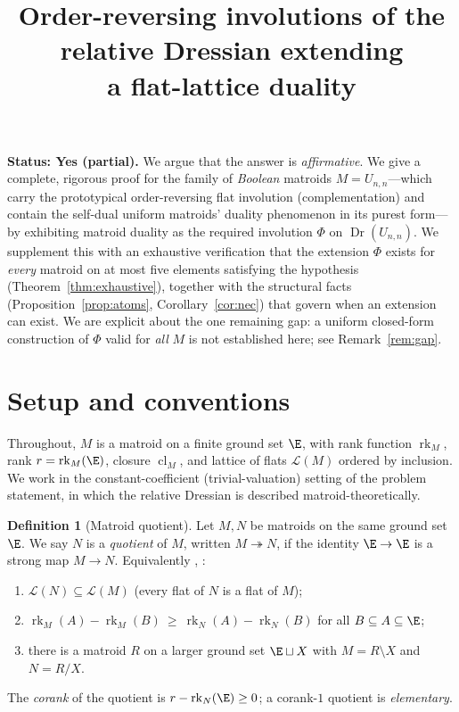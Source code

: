 \documentclass[11pt]{article}
\title{Order-reversing involutions of the relative Dressian extending\\
a flat-lattice duality}
\author{}
\date{}
\newcommand{\Dr}{\operatorname{Dr}}
\newcommand{\cL}{\mathcal{L}}
\newcommand{\rk}{\operatorname{rk}}
\newcommand{\cl}{\operatorname{cl}}
\theoremstyle{definition}
\newtheorem{definition}{Definition}
\theoremstyle{remark}
\begin{document}
\maketitle

\noindent\textbf{Status: Yes (partial).}
We argue that the answer is \emph{affirmative}. We give a complete, rigorous proof
for the family of \emph{Boolean} matroids $M=U_{n,n}$---which carry the prototypical
order-reversing flat involution (complementation) and contain the self-dual uniform
matroids' duality phenomenon in its purest form---by exhibiting matroid duality as
the required involution $\Phi$ on $\Dr(U_{n,n})$. We supplement this with an
exhaustive verification that the extension $\Phi$ exists for \emph{every} matroid
on at most five elements satisfying the hypothesis (Theorem~\ref{thm:exhaustive}),
together with the structural facts (Proposition~\ref{prop:atoms},
Corollary~\ref{cor:nec}) that govern when an extension can exist. We are explicit
about the one remaining gap: a uniform closed-form construction of $\Phi$ valid for
\emph{all} $M$ is not established here; see Remark~\ref{rem:gap}.

\bigskip

\section{Setup and conventions}\label{sec:setup}

Throughout, $M$ is a matroid on a finite ground set $\E$, with rank function
$\rk_M$, rank $r=\rk_M(\E)$, closure $\cl_M$, and lattice of flats $\cL(M)$ ordered
by inclusion. We work in the constant-coefficient (trivial-valuation) setting of the
problem statement, in which the relative Dressian is described matroid-theoretically.

\begin{definition}[Matroid quotient]\label{def:quot}
Let $M,N$ be matroids on the same ground set $\E$. We say $N$ is a \emph{quotient}
of $M$, written $M\twoheadrightarrow N$, if the identity $\E\to\E$ is a strong map
$M\to N$. Equivalently \cite[Ch.~7]{White}, \cite{Brylawski}:
\begin{enumerate}
\item[(Q1)] $\cL(N)\subseteq\cL(M)$ (every flat of $N$ is a flat of $M$);
\item[(Q2)] $\rk_M(A)-\rk_M(B)\ \ge\ \rk_N(A)-\rk_N(B)$ for all $B\subseteq A\subseteq\E$;
\item[(Q3)] there is a matroid $R$ on a larger ground set $\E\sqcup X$ with
$M=R\setminus X$ and $N=R/X$.
\end{enumerate}
The \emph{corank} of the quotient is $r-\rk_N(\E)\ge 0$; a corank-$1$ quotient is
\emph{elementary}.
\end{definition}
\end{document}
